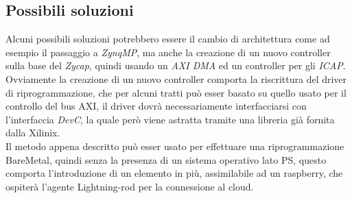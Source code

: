 \subsection{Possibili soluzioni}
Alcuni possibili soluzioni potrebbero essere il cambio di architettura come ad esempio il passaggio a \textit{ZynqMP}, ma anche la creazione di un nuovo controller sulla base del \textit{Zycap}, quindi usando un \textit{AXI DMA} ed un controller per gli \textit{ICAP}. Ovviamente la creazione di un nuovo controller comporta la riscrittura del driver di riprogrammazione, che per alcuni tratti può esser basato su quello usato per il controllo del bus AXI, il driver dovrà necessariamente interfacciarsi con l'interfaccia \textit{DevC}, la quale però viene astratta tramite una libreria già fornita dalla Xilinix.\\
Il metodo appena descritto può esser usato per effettuare una riprogrammazione BareMetal, quindi senza la presenza di un sistema operativo lato PS, questo comporta l'introduzione di un elemento in più, assimilabile ad un raspberry, che ospiterà l'agente Lightning-rod per la connessione al cloud.



